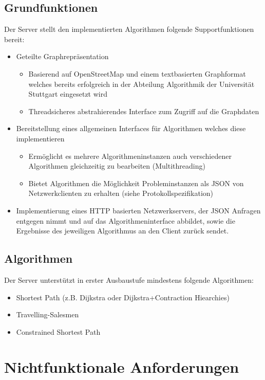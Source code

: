 \documentclass[a4paper,10pt,titlepage]{article}
\begin{document}
\subsection{Grundfunktionen}
Der Server stellt den implementierten Algorithmen folgende Supportfunktionen bereit:
\begin{itemize}
 \item Geteilte Graphrepräsentation
  \begin{itemize}
   \item 
    Basierend auf OpenStreetMap und einem textbasierten Graphformat welches 
    bereits erfolgreich in der Abteilung Algorithmik der Universität Stuttgart eingesetzt wird
   \item
    Threadsicheres abstrahierendes Interface zum Zugriff auf die Graphdaten
  \end{itemize}
  \item Bereitstellung eines allgemeinen Interfaces für Algorithmen welches diese implementieren
  \begin{itemize}
   \item Ermöglicht es mehrere Algorithmeninstanzen auch verschiedener Algorithmen gleichzeitig zu bearbeiten (Multithreading)
   \item Bietet Algorithmen die Möglichkeit Probleminstanzen als JSON von Netzwerkclienten zu erhalten (siehe Protokollspezifikation)
  \end{itemize}
 \item Implementierung eines HTTP basierten Netzwerkservers, der JSON Anfragen entgegen nimmt und auf das Algorithmeninterface abbildet, sowie
 die Ergebnisse des jeweiligen Algorithmus an den Client zurück sendet.
\end{itemize}
\subsection{Algorithmen}
Der Server unterstützt in erster Ausbaustufe mindestens folgende Algorithmen:
\begin{itemize}
 \item Shortest Path (z.B. Dijkstra oder Dijkstra+Contraction Hiearchies)
 \item Travelling-Salesmen
 \item Constrained Shortest Path
\end{itemize}


\section{Nichtfunktionale Anforderungen}
\end{document}
